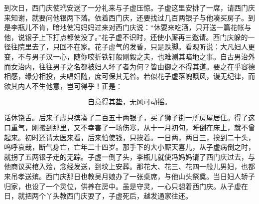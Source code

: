 到次日，西门庆使玳安送了一分礼来与子虚压惊。子虚这里安排了一席，请西门庆来知谢，就要问他银两下落。依着西门庆，还要找过几百两银子与他凑买房子。到是李瓶儿不肯，暗地使冯妈妈过来对西门庆说：“休要来吃酒，只开送一篇花帐与他，说银子上下打点都使没了。”花子虚不识时，还使小厮再三邀请。西门庆躲的一径往院里去了，只回不在家。花子虚气的发昏，只是跌脚。看观听说：大凡妇人更变，不与男子汉一心，随你咬折铁钉般刚毅之夫，也难测其暗地之事。自古男治外而女治内，往往男子之名都被妇人坏了者为何？皆由御之不得其道。要之在乎容德相感，缘分相投，夫唱妇随，庶可保其无咎。若似花子虚落魄飘风，谩无纪律，而欲其内人不生他意，岂可得乎！正是：

\[
自意得其垫，无风可动摇。
\]

话休饶舌。后来子虚只摈凑了二百五十两银子，买了狮子街一所房屋居住。得了这口重气，刚搬到那里，又不幸害了一场伤寒，从十一月初旬，睡倒在床上，就不曾起来。初时还请太医来看，后来怕使钱，只挨着。一日两，两日三，挨到二十头，呜呼哀哉，断气身亡，亡年二十四岁。那手下的大小厮天喜儿，从子虚病倒之时，就拐了五两银子走的无踪。子虚一倒了头，李瓶儿就使冯妈妈请了西门庆过去，与他商议买棺入殓，念经发送，到坟上安葬。那花大、花三、花四一般儿男妇，也都来吊孝送殡。西门庆那日也教吴月娘办了一张桌席，与他山头祭奠。当日妇人轿子归家，也设了一个灵位，供养在房中。虽是守灵，一心只想着西门庆。从子虚在日，就把两个丫头教西门庆耍了，子虚死后，越发通家往还。

